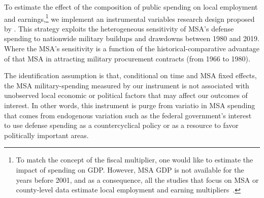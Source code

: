 \documentclass[dv_diss_main.tex]{subfiles}
\begin{document}
To estimate the effect of the composition of public spending on local employment and earnings,\footnote{To match the concept of the fiscal multiplier, one would like to estimate the impact of spending on GDP. However, MSA GDP is not available for the years before 2001, and as a consequence, all the studies that focus on MSA or county-level data estimate local employment and earning multipliers~\citep{suarez2016estimating, Auerbach2019, Demyanyk2019}.} we implement an instrumental variables research design proposed by \cite{Nakamura2014}. This strategy exploits the heterogeneous sensitivity of MSA's defense spending to nationwide military buildups and drawdowns between 1980 and 2019. Where the MSA's sensitivity is a function of the historical-comparative advantage of that MSA in attracting military procurement contracts (from 1966 to 1980).

The identification assumption is that, conditional on time and MSA fixed effects, the MSA military-spending measured by our instrument is not associated with unobserved local economic or political factors that may affect our outcomes of interest.  In other words, this instrument is purge from variatio in MSA spending that comes from endogenous variation such as the federal government's interest to use defense spending as a countercyclical policy or as a resource to favor politically important areas.
\end{document}
